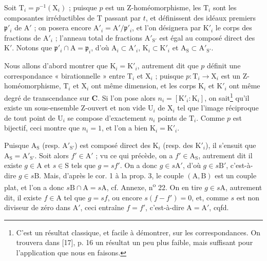 Soit $\mathrm{T}_i = p^{-1}(\mathrm{X}_i)$ ; puisque $p$ est un Z-homéomorphisme, les $\mathrm{T}_i$ sont les composantes irréductibles de $\mathrm{T}$ passant par $t$, et définissent des idéaux premiers $\mathfrak{p}'_i$ de $\mathrm{A}'$ ; on posera encore $\mathrm{A}'_i = \mathrm{A}'/\mathfrak{p}'_i$, et l'on désignera par $\mathrm{K}'_i$ le corps des fractions de $\mathrm{A}'_i$ ; l'anneau total de fractions $\mathrm{A}'_{\mathrm{S}'}$ est égal au composé direct des $\mathrm{K}'$. Notons que $\mathfrak{p}'_i \cap \mathrm{A} = \mathfrak{p}_i$, d'où $\mathrm{A}_i \subset \mathrm{A}'_i$, $\mathrm{K}_i \subset \mathrm{K}'_i$ et $\mathrm{A}_\mathrm{S} \subset \mathrm{A}'_{\mathrm{S}'}$.

Nous allons d'abord montrer que $\mathrm{K}_i = \mathrm{K}'_i$, autrement dit que $p$ définit une correspondance « birationnelle » entre $\mathrm{T}_i$ et $\mathrm{X}_i$ ; puisque $p : \mathrm{T}_i \to \mathrm{X}_i$ est un Z-homéomorphisme, $\mathrm{T}_i$ et $\mathrm{X}_i$ ont même dimension, et les corps $\mathrm{K}_i$ et $\mathrm{K}'_i$ ont même degré de transcendance sur $\mathbf{C}$. Si l'on pose alors $n_i = [\mathrm{K}'_i : \mathrm{K}_i]$, on sait\footnote{C'est un résultat classique, et facile à démontrer, sur les correspondances. On trouvera dans [17], p. 16 un résultat un peu plus faible, mais suffisant pour l'application que nous en faisons.} qu'il existe un sous-ensemble Z-ouvert et non vide $\mathrm{U}_i$ de $\mathrm{X}_i$ tel que l'image réciproque de tout point de $\mathrm{U}_i$ se compose d'exactement $n_i$ points de $\mathrm{T}_i$. Comme $p$ est bijectif, ceci montre que $n_i = 1$, et l'on a bien $\mathrm{K}_i = \mathrm{K}'_i$.

Puisque $\mathrm{A}_\mathrm{S}$ (resp. $\mathrm{A}'_{\mathrm{S}'}$) est composé direct des $\mathrm{K}_i$ (resp. %
des $\mathrm{K}'_i$), il s'ensuit que $\mathrm{A}_\mathrm{S} = \mathrm{A}'_{\mathrm{S}'}$. Soit alors $f' \in \mathrm{A}'$ ; vu ce qui précède, on a $f' \in \mathrm{A}_\mathrm{S}$, autrement dit il existe $g \in \mathrm{A}$ et $s \in \mathrm{S}$ tels que $g = sf'$. On a donc $g \in s\mathrm{A}'$, d'où $g \in s\mathrm{B}'$, c'est-à-dire $g \in s\mathrm{B}$. Mais, d'après le cor. 1 à la prop. 3, le couple $(\mathrm{A}, \mathrm{B})$ est un couple plat, et l'on a donc $s\mathrm{B} \cap \mathrm{A} = s\mathrm{A}$, cf. Annexe, n\textsuperscript{o} 22. On en tire $g \in s\mathrm{A}$, autrement dit, il existe $f \in \mathrm{A}$ tel que $g = sf$, ou encore $s(f - f') = 0$, et, comme $s$ est non diviseur de zéro dans $\mathrm{A}'$, ceci entraîne $f = f'$, c'est-à-dire $\mathrm{A} = \mathrm{A}'$, cqfd.

